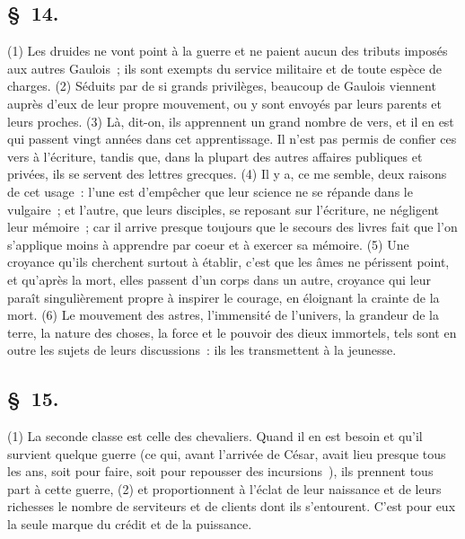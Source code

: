 \documentclass[french,twoside]{book} %
\begin{document}
\subsection[{§ 14.}]{ \textsc{§ 14.} }
\noindent (1) Les druides ne vont point à la guerre et ne paient aucun des tributs imposés aux autres Gaulois ; ils sont exempts du service militaire et de toute espèce de charges. (2) Séduits par de si grands privilèges, beaucoup de Gaulois viennent auprès d’eux de leur propre mouvement, ou y sont envoyés par leurs parents et leurs proches. (3) Là, dit-on, ils apprennent un grand nombre de vers, et il en est qui passent vingt années dans cet apprentissage. Il n’est pas permis de confier ces vers à l’écriture, tandis que, dans la plupart des autres affaires publiques et privées, ils se servent des lettres grecques. (4) Il y a, ce me semble, deux raisons de cet usage : l’une est d’empêcher que leur science ne se répande dans le vulgaire ; et l’autre, que leurs disciples, se reposant sur l’écriture, ne négligent leur mémoire ; car il arrive presque toujours que le secours des livres fait que l’on s’applique moins à apprendre par coeur et à exercer sa mémoire. (5) Une croyance qu’ils cherchent surtout à établir, c’est que les âmes ne périssent point, et qu’après la mort, elles passent d’un corps dans un autre, croyance qui leur paraît singulièrement propre à inspirer le courage, en éloignant la crainte de la mort. (6) Le mouvement des astres, l’immensité de l’univers, la grandeur de la terre, la nature des choses, la force et le pouvoir des dieux immortels, tels sont en outre les sujets de leurs discussions : ils les transmettent à la jeunesse.
\subsection[{§ 15.}]{ \textsc{§ 15.} }
\noindent (1) La seconde classe est celle des chevaliers. Quand il en est besoin et qu’il survient quelque guerre (ce qui, avant l’arrivée de César, avait lieu presque tous les ans, soit pour faire, soit pour repousser des incursions ), ils prennent tous part à cette guerre, (2) et proportionnent à l’éclat de leur naissance et de leurs richesses le nombre de serviteurs et de clients dont ils s’entourent. C'est pour eux la seule marque du crédit et de la puissance.
\end{document}
